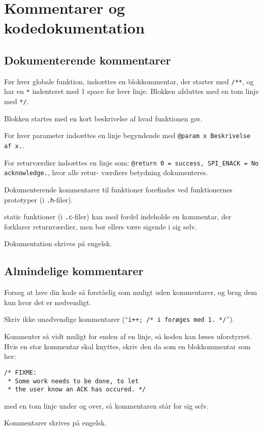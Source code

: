 \documentclass[article]{memoir}
\let\tempone\itemize
\let\temptwo\enditemize
\renewenvironment{itemize}{\tempone\firmlist}{\temptwo}
\begin{document}
\chapter{Kommentarer og kodedokumentation}

\section{Dokumenterende kommentarer}
\begin{itemize}
    \item Før hver globale funktion, indsættes en blokkommentar, der starter med \texttt{/**}, og har en \texttt{*} indenteret med 1 space for hver linje. Blokken afsluttes med en tom linje med \texttt{*/}.
    \item Blokken startes med en kort beskrivelse af hvad funktionen gør.
    \item For hver parameter indsættes en linje begyndende med \texttt{@param x Beskrivelse af x.}.
    \item For returværdier indsættes en linje som: \texttt{@return 0 = success, SPI\_ENACK = No acknowledge.}, hvor alle retur- værdiers betydning dokumenteres.
    \item Dokumenterende kommentarer til funktioner forefindes ved funktionernes prototyper (i \texttt{.h}-filer).
    \item static funktioner (i \texttt{.c}-filer) kan med fordel indeholde en kommentar, der forklarer returnværdier, men bør ellers være sigende i sig selv.
    \item Dokumentation skrives på engelsk.
\end{itemize}

\section{Almindelige kommentarer}
\begin{itemize}
    \item Forsøg at lave din kode så forståelig som muligt uden kommentarer, og brug dem kun hvor det er nødvendigt.
    \item Skriv ikke unødvendige kommentarer (``\texttt{i++; /* i forøges med 1. */}'').
    \item Kommenter så vidt muligt for enden af en linje, så koden kan læses uforstyrret. Hvis en stor kommentar skal knyttes, skriv den da som en blokkommentar som her:
        \begin{verbatim}
/* FIXME:
 * Some work needs to be done, to let
 * the user know an ACK has occured. */
        \end{verbatim}
        med en tom linje under og over, så kommentaren står for sig selv.
    \item Kommentarer skrives på engelsk.
\end{itemize}
\end{document}

